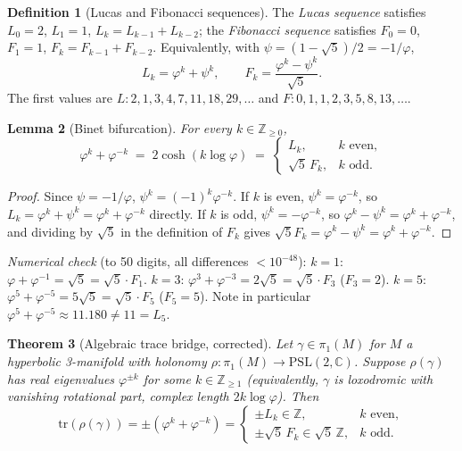 \documentclass[12pt]{article}
\newtheorem{theorem}{Theorem}
\newtheorem{lemma}[theorem]{Lemma}
\theoremstyle{definition}
\newtheorem{definition}[theorem]{Definition}
\newcommand{\Z}{\mathbb{Z}}
\newcommand{\C}{\mathbb{C}}
\newcommand{\ph}{\varphi}
\newcommand{\logph}{\log\ph}
\newcommand{\tr}{\mathrm{tr}}
\begin{document}
\begin{definition}[Lucas and Fibonacci sequences]
The \emph{Lucas sequence} satisfies $L_0=2$, $L_1=1$,
$L_k=L_{k-1}+L_{k-2}$; the \emph{Fibonacci sequence} satisfies
$F_0=0$, $F_1=1$, $F_k=F_{k-1}+F_{k-2}$. Equivalently, with
$\psi=(1-\sqrt5)/2=-1/\ph$,
\[
  L_k=\ph^k+\psi^k, \qquad F_k=\frac{\ph^k-\psi^k}{\sqrt5}.
\]
The first values are $L: 2,1,3,4,7,11,18,29,\ldots$ and
$F: 0,1,1,2,3,5,8,13,\ldots$.
\end{definition}

\begin{lemma}[Binet bifurcation]
\label{lem:bifurcation}
For every $k\in\Z_{\geq0}$,
\[
  \ph^k+\ph^{-k} \;=\; 2\cosh(k\logph) \;=\;
  \begin{cases}
    L_k, & k \text{ even},\\[2pt]
    \sqrt5\,F_k, & k \text{ odd}.
  \end{cases}
\]
\end{lemma}

\begin{proof}
Since $\psi=-1/\ph$, $\psi^k=(-1)^k\ph^{-k}$. If $k$ is even,
$\psi^k=\ph^{-k}$, so $L_k=\ph^k+\psi^k=\ph^k+\ph^{-k}$ directly. If
$k$ is odd, $\psi^k=-\ph^{-k}$, so $\ph^k-\psi^k=\ph^k+\ph^{-k}$, and
dividing by $\sqrt5$ in the definition of $F_k$ gives
$\sqrt5F_k=\ph^k-\psi^k=\ph^k+\ph^{-k}$.
\end{proof}

\noindent\emph{Numerical check} (to 50 digits, all differences
$<10^{-48}$): $k=1$: $\ph+\ph^{-1}=\sqrt5=\sqrt5\cdot F_1$. $k=3$:
$\ph^3+\ph^{-3}=2\sqrt5=\sqrt5\cdot F_3$ ($F_3=2$). $k=5$:
$\ph^5+\ph^{-5}=5\sqrt5=\sqrt5\cdot F_5$ ($F_5=5$). Note in particular
$\ph^5+\ph^{-5}\approx11.180\neq11=L_5$.

\begin{theorem}[Algebraic trace bridge, corrected]
\label{thm:bridge}
Let $\gamma\in\pi_1(M)$ for $M$ a hyperbolic 3-manifold with holonomy
$\rho\colon\pi_1(M)\to\mathrm{PSL}(2,\C)$. Suppose $\rho(\gamma)$ has
real eigenvalues $\ph^{\pm k}$ for some $k\in\Z_{\geq1}$ (equivalently,
$\gamma$ is loxodromic with vanishing rotational part, complex length
$2k\logph$). Then
\[
  \tr(\rho(\gamma)) = \pm(\ph^k+\ph^{-k}) =
  \begin{cases}
    \pm L_k \in \Z, & k \text{ even},\\[2pt]
    \pm\sqrt5\,F_k \in \sqrt5\,\Z, & k \text{ odd}.
  \end{cases}
\]
\end{theorem}
\end{document}
